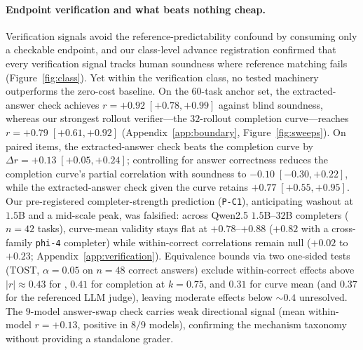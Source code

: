 \paragraph{Endpoint verification and what beats nothing cheap.}
Verification signals avoid the reference-predictability confound by consuming only a checkable endpoint, and our class-level advance registration confirmed that every verification signal tracks human soundness where reference matching fails (Figure~\ref{fig:class}).
Yet within the verification class, no tested machinery outperforms the zero-cost baseline.
On the $60$-task anchor set, the extracted-answer check achieves $r = +0.92 \; [+0.78, +0.99]$ against blind soundness, whereas our strongest rollout verifier---the $32$-rollout completion curve---reaches $r = +0.79 \; [+0.61, +0.92]$ (Appendix~\ref{app:boundary}, Figure~\ref{fig:sweeps}).
On paired items, the extracted-answer check beats the completion curve by $\Delta r = +0.13 \; [+0.05, +0.24]$; controlling for answer correctness reduces the completion curve's partial correlation with soundness to $-0.10 \; [-0.30, +0.22]$, while the extracted-answer check given the curve retains $+0.77 \; [+0.55, +0.95]$.
Our pre-registered completer-strength prediction (\texttt{P-C1}), anticipating washout at $1.5$B and a mid-scale peak, was falsified: across Qwen2.5 $1.5$B--$32$B completers ($n{=}42$ tasks), curve-mean validity stays flat at $+0.78$--$+0.88$ ($+0.82$ with a cross-family \texttt{phi-4} completer) while within-correct correlations remain null ($+0.02$ to $+0.23$; Appendix~\ref{app:verification}).
Equivalence bounds via two one-sided tests (TOST, $\alpha = 0.05$ on $n{=}48$ correct answers) exclude within-correct effects above $|r| \approx 0.43$ for \tfa{}, $0.41$ for completion at $k{=}0.75$, and $0.31$ for curve mean (and $0.37$ for the referenced LLM judge), leaving moderate effects below $\sim 0.4$ unresolved.
The $9$-model answer-swap check carries weak directional signal (mean within-model $r = +0.13$, positive in $8/9$ models), confirming the mechanism taxonomy without providing a standalone grader.
